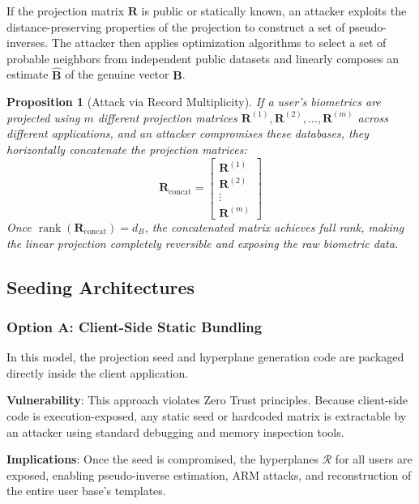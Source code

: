 \documentclass[11pt,twoside]{amsart}
\theoremstyle{plain}
\newtheorem{proposition}[theorem]{Proposition}
\theoremstyle{definition}
\theoremstyle{remark}
\DeclareMathOperator{\rank}{rank}
\newcommand{\bB}{\mathbf{B}}
\newcommand{\bR}{\mathbf{R}}
\newcommand{\calR}{\mathcal{R}}
\begin{document}
If the projection matrix $\bR$ is public or statically known, an attacker exploits the distance-preserving properties of the projection to construct a set of pseudo-inverses. The attacker then applies optimization algorithms to select a set of probable neighbors from independent public datasets and linearly composes an estimate $\hat{\bB}$ of the genuine vector $\bB$.

\begin{proposition}[Attack via Record Multiplicity]
\label{prop:arm}
If a user's biometrics are projected using $m$ different projection matrices $\bR^{(1)}, \bR^{(2)}, \ldots, \bR^{(m)}$ across different applications, and an attacker compromises these databases, they horizontally concatenate the projection matrices:
\begin{equation}
\bR_{\text{concat}} = \begin{bmatrix} \bR^{(1)} \\ \bR^{(2)} \\ \vdots \\ \bR^{(m)} \end{bmatrix}
\end{equation}
Once $\rank(\bR_{\text{concat}}) = d_B$, the concatenated matrix achieves full rank, making the linear projection completely reversible and exposing the raw biometric data.
\end{proposition}

\subsection{Seeding Architectures}

\subsubsection{Option A: Client-Side Static Bundling}

In this model, the projection seed and hyperplane generation code are packaged directly inside the client application.

\textbf{Vulnerability}: This approach violates Zero Trust principles. Because client-side code is execution-exposed, any static seed or hardcoded matrix is extractable by an attacker using standard debugging and memory inspection tools.

\textbf{Implications}: Once the seed is compromised, the hyperplanes $\calR$ for all users are exposed, enabling pseudo-inverse estimation, ARM attacks, and reconstruction of the entire user base's templates.
\end{document}
